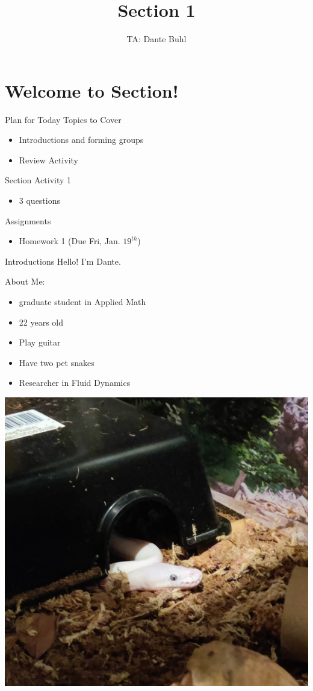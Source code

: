 \documentclass{beamer}
\title{Section 1}
\author{TA: Dante Buhl}
\institute{UCSC Math-19B}
\begin{document}
\newcommand{\bmp}[1]{\begin{minipage}{#1\textwidth}}
\newcommand{\emp}{\end{minipage}}


\frame{\titlepage}

\section{Welcome to Section!}
\begin{frame}{Plan for Today}
    Topics to Cover
    \begin{itemize}
        \item Introductions and forming groups
        \item Review Activity
    \end{itemize}
    Section Activity 1
    \begin{itemize}
        \item 3 questions
    \end{itemize}
    Assignments
    \begin{itemize}
        \item Homework 1 (Due Fri, Jan. $19^{th}$)
    \end{itemize}
\end{frame}

\begin{frame}{Introductions}
    Hello! I'm Dante. 
    \vspace{10pt}

    \bmp{.4}
        About Me:
        \begin{itemize}
            \item graduate student in Applied Math
            \item 22 years old
            \item Play guitar
            \item Have two pet snakes
            \item Researcher in Fluid Dynamics
        \end{itemize}
    \emp
    \hspace{5pt}
    \bmp{.55}
        \centering
        \includegraphics[width=.75\textwidth]{duncan.jpg}
    \emp
\end{frame}
\end{document}
